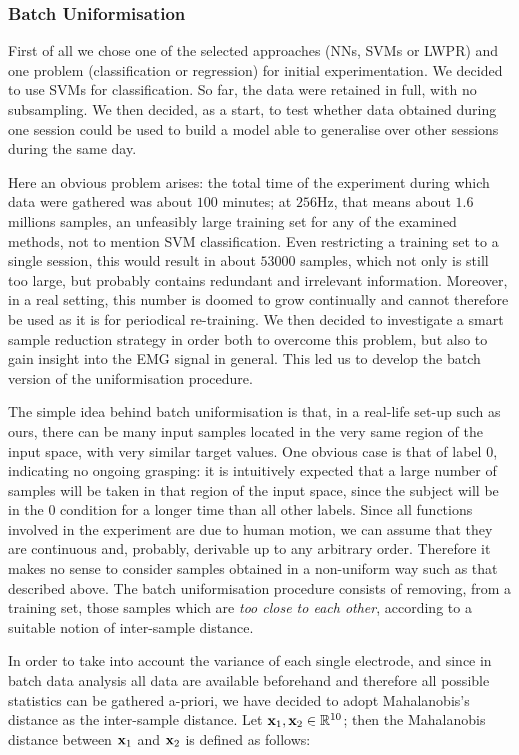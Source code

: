 \subsubsection{Batch Uniformisation}

First of all we chose one of the selected approaches (NNs, SVMs or
LWPR) and one problem (classification or regression) for initial
experimentation. We decided to use SVMs for classification. So far,
the data were retained in full, with no subsampling. We then decided,
as a start, to test whether data obtained during one session could be
used to build a model able to generalise over other sessions during
the same day.

Here an obvious problem arises: the total time of the experiment
during which data were gathered was about $100$ minutes; at $256$Hz,
that means about $1.6$ millions samples, an unfeasibly large training
set for any of the examined methods, not to mention SVM
classification. Even restricting a training set to a single session,
this would result in about $53000$ samples, which not only is still
too large, but probably contains redundant and irrelevant information.
Moreover, in a real setting, this number is doomed to grow continually
and cannot therefore be used as it is for periodical re-training. We
then decided to investigate a smart sample reduction strategy in order
both to overcome this problem, but also to gain insight into the EMG
signal in general. This led us to develop the batch version of the
uniformisation procedure.

The simple idea behind batch uniformisation is that, in a real-life
set-up such as ours, there can be many input samples located in the
very same region of the input space, with very similar target
values. One obvious case is that of label $0$, indicating no ongoing
grasping: it is intuitively expected that a large number of samples
will be taken in that region of the input space, since the subject
will be in the $0$ condition for a longer time than all other
labels. Since all functions involved in the experiment are due to
human motion, we can assume that they are continuous and, probably,
derivable up to any arbitrary order. Therefore it makes no sense to
consider samples obtained in a non-uniform way such as that described
above. The batch uniformisation procedure consists of removing, from a
training set, those samples which are \emph{too close to each other},
according to a suitable notion of inter-sample distance.

In order to take into account the variance of each single electrode,
and since in batch data analysis all data are available beforehand and
therefore all possible statistics can be gathered a-priori, we have
decided to adopt Mahalanobis's distance as the inter-sample
distance. Let $\mathbf{x}_1, \mathbf{x}_2 \in \mathbb{R}^{10}$; then the Mahalanobis
distance between $\mathbf{x}_1$ and $\mathbf{x}_2$ is defined as follows:

